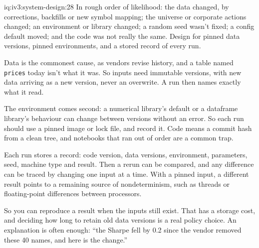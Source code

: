 \begin{solution}{iq:iv3:system-design:28}
In rough order of likelihood: the data changed, by corrections, backfills or new symbol mapping; the universe or corporate actions changed; an environment or library changed; a random seed wasn't fixed; a config default moved; and the code was not really the same. Design for pinned data versions, pinned environments, and a stored record of every run.

Data is the commonest cause, as vendors revise history, and a table named \texttt{prices} today isn't what it was. So inputs need immutable versions, with new data arriving as a new version, never an overwrite. A run then names exactly what it read.

The environment comes second: a numerical library's default or a dataframe library's behaviour can change between versions without an error. So each run should use a pinned image or lock file, and record it. Code means a commit hash from a clean tree, and notebooks that ran out of order are a common trap.

Each run stores a record: code version, data versions, environment, parameters, seed, machine type and result. Then a rerun can be compared, and any difference can be traced by changing one input at a time. With a pinned input, a different result points to a remaining source of nondeterminism, such as threads or floating-point differences between processors.

So you can reproduce a result when the inputs still exist. That has a storage cost, and deciding how long to retain old data versions is a real policy choice. An explanation is often enough: ``the Sharpe fell by 0.2 since the vendor removed these 40 names, and here is the change.''

\end{solution}

